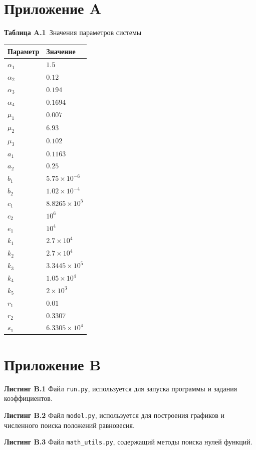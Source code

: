 \documentclass[14pt,a4paper]{extarticle}
\begin{document}
	\section*{Приложение A}
	\begin{center}
		\textbf{Таблица A.1}~Значения параметров системы
		\begin{tabu}{ |X[c]|X[c]| } 
			\hline
			Параметр & Значение\\
			\hline 
			$\alpha_1$ & $1.5$\\
			$\alpha_2$ & $0.12$\\
			$\alpha_3$ & $0.194$\\
			$\alpha_4$ & $0.1694$\\ 
			$\mu_1$ & $0.007$\\ 
			$\mu_2$ & $6.93$\\ 
			$\mu_3$ & $0.102$\\
			$a_1$ & $0.1163$\\
			$a_2$ & $0.25$\\
			$b_1$ & $5.75\times10^{-6}$\\
			$b_2$ & $1.02\times10^{-4}$\\
			$c_1$ & $8.8265\times10^5$\\
			$c_2$ & $10^6$\\
			$e_1$ & $10^4$\\
			$k_1$ & $2.7\times10^4$\\
			$k_2$ & $2.7\times10^4$\\
			$k_3$ & $3.3445\times10^5$\\
			$k_4$ & $1.05\times10^4$\\
			$k_5$ & $2\times10^3$\\
			$r_1$ & $0.01$\\
			$r_2$ & $0.3307$\\
			$s_1$ & $6.3305\times10^4$\\
			\hline
		\end{tabu}
	\end{center}
	
	\section*{Приложение B}
	\begin{center}
		\textbf{Листинг B.1} Файл \texttt{run.py}, используется для запуска программы и задания коэффициентов.
	\end{center}
	
	\newpage
	\begin{center}
		\textbf{Листинг B.2} Файл \texttt{model.py}, используется для построения графиков и численного поиска положений равновесия.
	\end{center}
	
	\newpage
	\begin{center}
		\textbf{Листинг B.3} Файл \texttt{math\_utils.py}, содержащий методы поиска нулей функций.
	\end{center}
	
\end{document}
